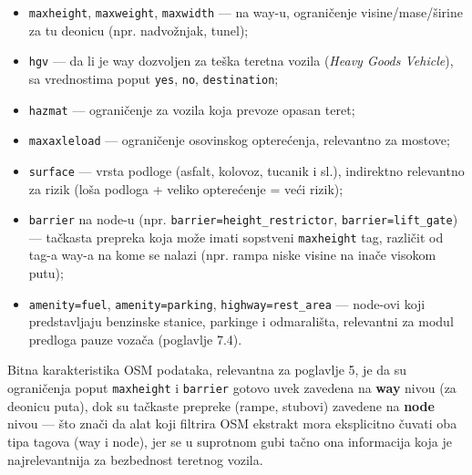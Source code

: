 \begin{itemize}
\item \texttt{maxheight}, \texttt{maxweight}, \texttt{maxwidth} — na way-u, ograničenje visine/mase/širine za tu deonicu (npr. nadvožnjak, tunel);
\item \texttt{hgv} — da li je way dozvoljen za teška teretna vozila (\emph{Heavy Goods Vehicle}), sa vrednostima poput \texttt{yes}, \texttt{no}, \texttt{destination};
\item \texttt{hazmat} — ograničenje za vozila koja prevoze opasan teret;
\item \texttt{maxaxleload} — ograničenje osovinskog opterećenja, relevantno za mostove;
\item \texttt{surface} — vrsta podloge (asfalt, kolovoz, tucanik i sl.), indirektno relevantno za rizik (loša podloga + veliko opterećenje = veći rizik);
\item \texttt{barrier} na node-u (npr. \texttt{barrier=height\_restrictor}, \texttt{barrier=lift\_gate}) — tačkasta prepreka koja može imati sopstveni \texttt{maxheight} tag, različit od tag-a way-a na kome se nalazi (npr. rampa niske visine na inače visokom putu);
\item \texttt{amenity=fuel}, \texttt{amenity=parking}, \texttt{highway=rest\_area} — node-ovi koji predstavljaju benzinske stanice, parkinge i odmarališta, relevantni za modul predloga pauze vozača (poglavlje 7.4).
\end{itemize}

Bitna karakteristika OSM podataka, relevantna za poglavlje 5, je da su ograničenja poput \texttt{maxheight} i \texttt{barrier} gotovo uvek zavedena na \textbf{way} nivou (za deonicu puta), dok su tačkaste prepreke (rampe, stubovi) zavedene na \textbf{node} nivou — što znači da alat koji filtrira OSM ekstrakt mora eksplicitno čuvati oba tipa tagova (way i node), jer se u suprotnom gubi tačno ona informacija koja je najrelevantnija za bezbednost teretnog vozila.

\clearpage
